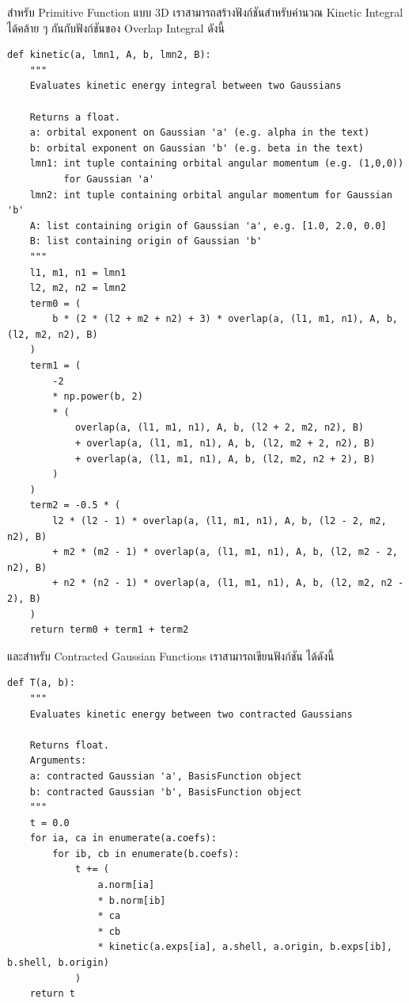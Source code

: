 สำหรับ Primitive Function แบบ 3D เราสามารถสร้างฟังก์ชันสำหรับคำนวณ Kinetic Integral ได้คล้าย ๆ กันกับฟังก์ชันของ Overlap Integral ดังนี้

\vspace{5pt}

\begin{lstlisting}[style=MyPython]
def kinetic(a, lmn1, A, b, lmn2, B):
    """
    Evaluates kinetic energy integral between two Gaussians

    Returns a float.
    a: orbital exponent on Gaussian 'a' (e.g. alpha in the text)
    b: orbital exponent on Gaussian 'b' (e.g. beta in the text)
    lmn1: int tuple containing orbital angular momentum (e.g. (1,0,0))
          for Gaussian 'a'
    lmn2: int tuple containing orbital angular momentum for Gaussian 'b'
    A: list containing origin of Gaussian 'a', e.g. [1.0, 2.0, 0.0]
    B: list containing origin of Gaussian 'b'
    """
    l1, m1, n1 = lmn1
    l2, m2, n2 = lmn2
    term0 = (
        b * (2 * (l2 + m2 + n2) + 3) * overlap(a, (l1, m1, n1), A, b, (l2, m2, n2), B)
    )
    term1 = (
        -2
        * np.power(b, 2)
        * (
            overlap(a, (l1, m1, n1), A, b, (l2 + 2, m2, n2), B)
            + overlap(a, (l1, m1, n1), A, b, (l2, m2 + 2, n2), B)
            + overlap(a, (l1, m1, n1), A, b, (l2, m2, n2 + 2), B)
        )
    )
    term2 = -0.5 * (
        l2 * (l2 - 1) * overlap(a, (l1, m1, n1), A, b, (l2 - 2, m2, n2), B)
        + m2 * (m2 - 1) * overlap(a, (l1, m1, n1), A, b, (l2, m2 - 2, n2), B)
        + n2 * (n2 - 1) * overlap(a, (l1, m1, n1), A, b, (l2, m2, n2 - 2), B)
    )
    return term0 + term1 + term2
\end{lstlisting}

\vspace{5pt}

\noindent และสำหรับ Contracted Gaussian Functions เราสามารถเขียนฟังก์ชัน  ได้ดังนี้

\vspace{5pt}

\begin{lstlisting}[style=MyPython]
def T(a, b):
    """
    Evaluates kinetic energy between two contracted Gaussians

    Returns float.
    Arguments:
    a: contracted Gaussian 'a', BasisFunction object
    b: contracted Gaussian 'b', BasisFunction object
    """
    t = 0.0
    for ia, ca in enumerate(a.coefs):
        for ib, cb in enumerate(b.coefs):
            t += (
                a.norm[ia]
                * b.norm[ib]
                * ca
                * cb
                * kinetic(a.exps[ia], a.shell, a.origin, b.exps[ib], b.shell, b.origin)
            )
    return t
\end{lstlisting}

